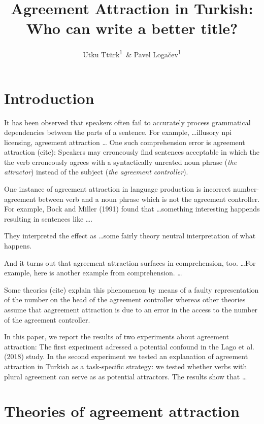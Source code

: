\documentclass[english,doc]{apa6}
\author{Utku Ttürk\textsuperscript{1}\ \& Pavel Logačev\textsuperscript{1}}
\affiliation{
\vspace{0.5cm}
\textsuperscript{1} Boğaziçi University University, Istanbul, Turkey}
\title{Agreement Attraction in Turkish: Who can write a better title?}
\date{}
\begin{document}
\maketitle

\section*{Introduction}

It has been observed that speakers often fail to accurately process grammatical dependencies between the parts of a sentence.
For example, \ldots illusory npi licensing, agreement attraction \ldots
One such comprehension error is agreement attraction (cite): Speakers may erroneously find sentences acceptable in which the the verb erroneously agrees with a syntactically unreated noun phrase (\emph{the attractor}) instead of the subject (\emph{the agreement controller}).

One instance of agreement attraction in language production is incorrect number-agreement between verb and a noun phrase which is not the agreement controller. For example, Bock and Miller (1991) found
that \ldots something interesting happends resulting in sentences like \ldots.

\begin{exe}
\label{AAEx1}
\end{exe}

They interpreted the effect as \ldots some fairly theory neutral interpretation of what happens.

And it turns out that agreement attraction surfaces in comprehension, too. \ldots For example, here is another example from comprehension. \ldots 

Some theories (cite) explain this phenomenon by means of a faulty representation of the number on the head of the agreement controller whereas other theories assume that aagreement attraction is due to an error in the access to the number of the agreement controller.

In this paper, we report the results of two experiments about agreement attraction: The first experiment adressed a potential confound in the Lago et al. (2018) study. In the second experiment we tested an explanation of agreement attraction in Turkish as a task-specific strategy: we tested whether verbs with plural agreement can serve as as potential attractors.
The results show that \ldots 

\hypertarget{theories-of-agreement-attraction}{%
\section{Theories of agreement attraction}\label{theories-of-agreement-attraction}}
\end{document}
